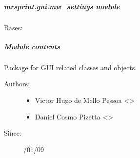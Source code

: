 \documentclass[a4paper,10pt,english]{sphinxmanual}
\begin{document}
\subparagraph{mrsprint.gui.mw\_settings module}
\label{\detokenize{autodoc/mrsprint/mrsprint.gui:module-mrsprint.gui.mw_settings}}\label{\detokenize{autodoc/mrsprint/mrsprint.gui:mrsprint-gui-mw-settings-module}}

\begin{fulllineitems}
\label{\detokenize{autodoc/mrsprint/mrsprint.gui:mrsprint.gui.mw_settings.Ui_Settings}}
Bases: 

\begin{fulllineitems}
\label{\detokenize{autodoc/mrsprint/mrsprint.gui:mrsprint.gui.mw_settings.Ui_Settings.retranslateUi}}
\end{fulllineitems}


\begin{fulllineitems}
\label{\detokenize{autodoc/mrsprint/mrsprint.gui:mrsprint.gui.mw_settings.Ui_Settings.setupUi}}
\end{fulllineitems}


\end{fulllineitems}



\subparagraph{Module contents}
\label{\detokenize{autodoc/mrsprint/mrsprint.gui:module-mrsprint.gui}}\label{\detokenize{autodoc/mrsprint/mrsprint.gui:module-contents}}
Package for GUI related classes and objects.
\begin{description}
\item[{Authors:}] \leavevmode\begin{itemize}
\item {} 
Victor Hugo de Mello Pessoa \textless{}\textgreater{}

\item {} 
Daniel Cosmo Pizetta \textless{}\textgreater{}

\end{itemize}

\item[{Since:}] /01/09

\end{description}
\end{document}
